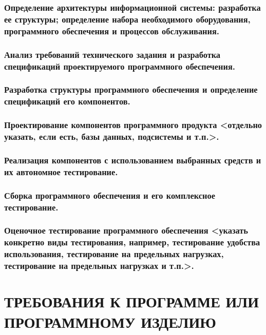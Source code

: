 \documentclass[utf8x, 12pt, oneside, a4paper]{article}
\begin{document}
	\subsubsection{\textbf{Определение архитектуры информационной системы: разработка ее структуры; определение набора необходимого оборудования, программного обеспечения и процессов обслуживания.}}

	\subsubsection{Анализ требований технического задания и разработка спецификаций проектируемого программного обеспечения.}

	\subsubsection{Разработка структуры программного обеспечения и определение спецификаций его компонентов.}

	\subsubsection{Проектирование компонентов программного продукта \textbf{<отдельно указать, если есть, базы данных, подсистемы и т.п.>.}}

	\subsubsection{Реализация компонентов с использованием выбранных средств и их автономное тестирование.}

	\subsubsection{Сборка программного обеспечения и его комплексное тестирование.}

	\subsubsection{Оценочное тестирование программного обеспечения \textbf{<указать конкретно виды тестирования, например, тестирование удобства использования, тестирование на предельных нагрузках, тестирование на предельных нагрузках и т.п.>.}}

	\section{ТРЕБОВАНИЯ \textbf{К ПРОГРАММЕ ИЛИ ПРОГРАММНОМУ ИЗДЕЛИЮ}}
\end{document}
